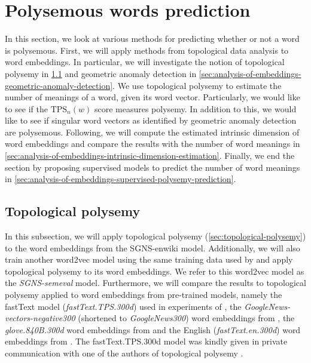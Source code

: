 \section{Polysemous words prediction}
\label{sec:polysemous-words-prediction}
In this section, we look at various methods for predicting whether or not a word is polysemous. First, we will apply methods from topological data analysis to word embeddings. In particular, we will investigate the notion of topological polysemy in \cref{sec:analysis-of-embeddings-topological-polysemy} and geometric anomaly detection in \cref{sec:analysis-of-embeddings-geometric-anomaly-detection}. We use topological polysemy to estimate the number of meanings of a word, given its word vector. Particularly, we would like to see if the $\text{TPS}_n(w)$ score measures polysemy. In addition to this, we would like to see if singular word vectors as identified by geometric anomaly detection are polysemous. Following, we will compute the estimated intrinsic dimension of word embeddings and compare the results with the number of word meanings in \cref{sec:analysis-of-embeddings-intrinsic-dimension-estimation}. Finally, we end the section by proposing supervised models to predict the number of word meanings in \cref{sec:analysis-of-embeddings-supervised-polysemy-prediction}.

\subsection{Topological polysemy}
\label{sec:analysis-of-embeddings-topological-polysemy}
In this subsection, we will apply topological polysemy (\cref{sec:topological-polysemy}) to the word embeddings from the SGNS-enwiki model. Additionally, we will also train another word2vec model using the same training data used by \cite{jakubowski2020topology} and apply topological polysemy to its word embeddings. We refer to this word2vec model as the \textit{SGNS-semeval} model. Furthermore, we will compare the results to topological polysemy applied to word embeddings from pre-trained models, namely the fastText model (\textit{fastText.TPS.300d}) used in experiments of \cite{jakubowski2020topology}, the \textit{GoogleNews-vectors-negative300} (shortened to \textit{GoogleNews300}) word embeddings from \cite{GoogleCodeArchiveWord2vec}, the \textit{glove.840B.300d} word embeddings from \cite{GloVeProject2014} and the English (\textit{fastText.en.300d}) word embeddings from \cite{grave2018learning}. The fastText.TPS.300d model was kindly given in private communication with one of the authors of topological polysemy \cite{ZibrowiusPrivComs2021}.

